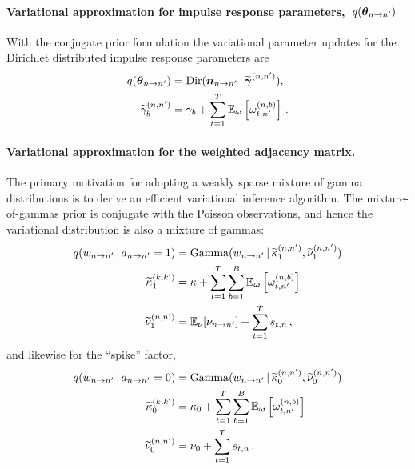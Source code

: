 \paragraph{Variational approximation for impulse response parameters,~$q(\boldsymbol{\theta}_{n \to n'})$}
With the conjugate prior formulation the variational parameter updates
for the Dirichlet distributed impulse response parameters are
\begin{align*}
q(\boldsymbol{\theta}_{n \to n'}) &= \mathrm{Dir}(\boldsymbol{n}_{n \to n'} \,|\, \widetilde{\boldsymbol{\gamma}}^{(n,n')}), \\
\widetilde{\gamma}_b^{(n,n')} &= \gamma_{b} + \sum_{t=1}^T \mathbb{E}_{\boldsymbol{\omega}}\left[\omega_{t,n'}^{(n,b)}\right]\,.
\end{align*}

\paragraph{Variational approximation for the weighted adjacency matrix.}
The primary motivation for adopting a weakly sparse mixture of gamma
distributions is to derive an efficient variational inference
algorithm.  The mixture-of-gammas prior is conjugate with the Poisson
observations, and hence the variational distribution is also a mixture
of gammas:
\begin{align*}
  q(w_{n \to n'} \,|\, a_{n \to n'}=1)
  &= \mathrm{Gamma}(w_{n \to n'} \,|\,
  \widetilde{\kappa}^{(n,n')}_1,
  \widetilde{\nu}^{(n,n')}_1) \\
  \widetilde{\kappa}^{(k,k')}_1
  &= \kappa + \sum_{t=1}^T \sum_{b=1}^B \mathbb{E}_{\boldsymbol{\omega}}\left[\omega_{t,n'}^{(n,b)}\right] \\
  \widetilde{\nu}^{(n,n')}_1
  &= \mathbb{E}_{\nu}[\nu_{n \to n'}] + \sum_{t=1}^T s_{t,n}\,,
\end{align*}
and likewise for the ``spike'' factor,
\begin{align*}
  q(w_{n \to n'} \,|\, a_{n \to n'}=0)
  &= \mathrm{Gamma}(w_{n \to n'} \,|\,
  \widetilde{\kappa}^{(n,n')}_0,
  \widetilde{\nu}^{(n,n')}_0) \\
  \widetilde{\kappa}^{(k,k')}_0
  &= \kappa_0 + \sum_{t=1}^T \sum_{b=1}^B \mathbb{E}_{\boldsymbol{\omega}}\left[\omega_{t,n'}^{(n,b)}\right] \\
  \widetilde{\nu}^{(n,n')}_0
  &= \nu_0 + \sum_{t=1}^T s_{t,n}\,.
\end{align*}

